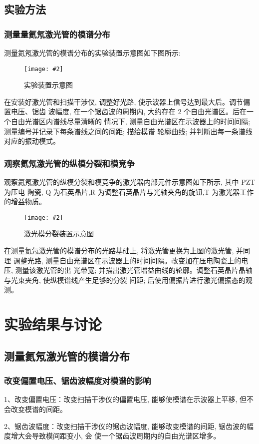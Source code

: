 \documentclass[12pt,a4paper]{article}
\newcommand{\bfig}[3]{
    \begin{figure}[H]
        \centering
        \texttt{[image: \#2]}
        \caption{#3}
    \end{figure}
}
\begin{document}
\subsection{实验方法}
\subsubsection{测量量氦氖激光管的模谱分布}
测量氦氖激光管的模谱分布的实验装置示意图如下图所示:
\bfig{0.8}{实验装置示意图.png}{实验装置示意图}
在安装好激光管和扫描干涉仪, 调整好光路, 使示波器上信号达到最大后。调节偏置电压、锯齿
波幅度, 在一个锯齿波的周期内, 大约存在 2 个自由光谱区。后在一个自由光谱区内谱线尽量清晰的
情况下, 测量自由光谱区在示波器上的时间间隔; 测量编号并记录下每条谱线之间的间距; 描绘模谱
轮廓曲线; 并判断出每一条谱线对应的振动模式。
\subsubsection{观察氦氖激光管的纵模分裂和模竞争}
观察氦氖激光管的纵模分裂和模竞争的激光器内部元件示意图如下所示, 其中 PZT 为压电
陶瓷, Q 为石英晶片,R 为调整石英晶片与光轴夹角的旋钮,T 为激光器工作的增益物质。
\bfig{0.8}{模分裂装置示意图.png}{激光模分裂装置示意图}
在测量氦氖激光管的模谱分布的光路基础上, 将激光管更换为上图的激光管, 并同理
调整光路, 测量自由光谱区在示波器上的时间间隔。改变加在压电陶瓷上的电压, 测量该激光管的出
光带宽; 并描出激光管增益曲线的轮廓。调整石英晶片晶轴与光束夹角, 使纵模谱线产生足够的分裂
间距; 后使用偏振片进行激光偏振态的观测。
\section{实验结果与讨论}
\subsection{测量氦氖激光管的模谱分布}
\subsubsection{改变偏置电压、锯齿波幅度对模谱的影响}
1、改变偏置电压：改变扫描干涉仪的偏置电压, 能够使模谱在示波器上平移, 但不会改变模谱的间距。

2、锯齿波幅度：改变扫描干涉仪的锯齿波幅度, 能够改变模谱的间距, 锯齿波的幅度增大会导致模间距变小, 会
使一个锯齿波周期内的自由光谱区增多。
\end{document}
